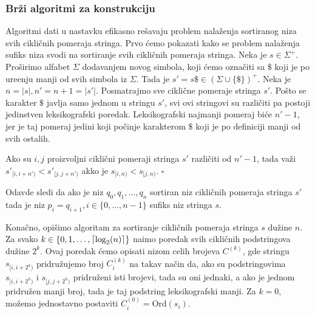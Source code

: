 \subsubsection{Br\v zi algoritmi za konstrukciju}

Algoritmi dati u nastavku efikasno re\v savaju problem nala\v zenja sortiranog niza svih cikli\v cnih pomeraja stringa. Prvo \' cemo pokazati kako se problem nala\v zenja sufiks niza svodi na sortiranje svih cikli\v cnih pomeraja stringa. Neka je $s \in \Sigma^+$. Pro\v sirimo alfabet $\Sigma$ dodavanjem novog simbola, koji \' cemo ozna\v citi sa $\$$ koji je po ure\dj enju manji od svih simbola iz $\Sigma$. Tada je $s' = s\$ \in (\Sigma \cup \{\$\})^+$. Neka je $n = |s|, n' = n+1 = |s'|$. Posmatrajmo sve cikli\v cne pomeraje stringa $s'$. Po\v sto se karakter $\$$ javlja samo jednom u stringu $s'$, svi ovi stringovi su razli\v citi pa postoji jedinstven leksikografski poredak. Leksikografski najmanji pomeraj bi\' ce $n'-1$, jer je taj pomeraj jedini koji po\v cinje karakterom $\$$ koji je po definiciji manji od svih ostalih.

\begin{thm}
Ako su $i,j$ proizvoljni cikli\v cni pomeraji stringa $s'$ razli\v citi od $n'-1$, tada va\v zi $s'_{[i, i+n')} < s'_{[j, j+n')}$ akko je $s_{[i, n)} < s_{[j, n)}$. \hfill $\square$
\end{thm}

Odavde sledi da ako je niz $q_0, q_1, \ldots, q_n$ sortiran niz cikli\v cnih pomeraja stringa $s'$ tada je niz $p_i = q_{i+1}, i \in \{0, \ldots, n-1\}$ sufiks niz stringa $s$.

\noindent
\begin{minipage}[l]{\textwidth}

\end{minipage}

Kona\v cno, opi\v simo algoritam za sortiranje cikli\v cnih pomeraja stringa $s$ du\v zine $n$. Za svako $k \in \{0, 1, \ldots, \left \lceil \log_2(n) \right \rceil \}$ na\dj imo poredak svih cikli\v cnih podstringova du\v zine $2^k$. Ovaj poredak \' cemo opisati nizom celih brojeva $C^{(k)}$, gde stringu $s_{[i, i+2^k)}$ pridru\v zujemo broj $C^{(k)}_i$ na takav na\v cin da, ako su podstringovima $s_{[i, i+2^k)}$ i $s_{[j, j+2^k)}$ pridru\v zeni isti brojevi, tada su oni jednaki, a ako je jednom pridru\v zen manji broj, tada je taj podstring leksikografski manji. Za $k=0$, mo\v zemo jednostavno postaviti $C^{(0)}_i = \text{Ord}(s_i)$.

